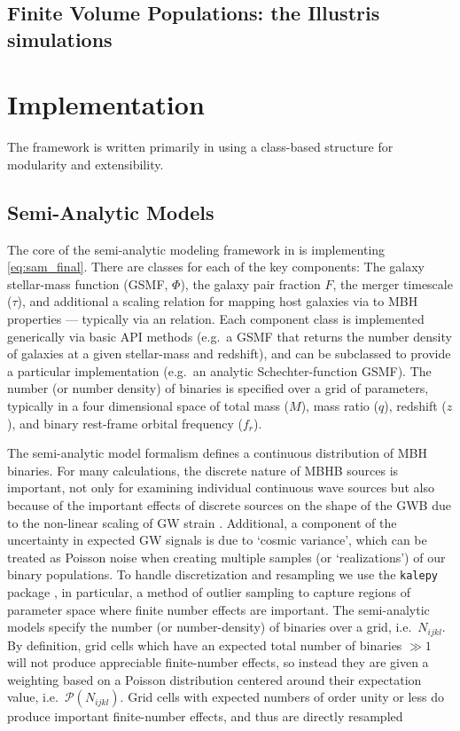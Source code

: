     \subsection{Finite Volume Populations: the Illustris simulations}




\section{Implementation}
    \label{sec:imp}

    The \holodeck{} framework is written primarily in \python{} using a class-based structure for modularity and extensibility.

    \subsection{Semi-Analytic Models}
        \label{sec:imp_sam}

        The core of the semi-analytic modeling framework in \holodeck{} is implementing \eqref{eq:sam_final}.  There are classes for each of the key components: The galaxy stellar-mass function (GSMF, $\Phi$), the galaxy pair fraction \(F\), the merger timescale ($\tau$), and additional a scaling relation for mapping host galaxies via to MBH properties --- typically via an \mmbulge{} relation.  Each component class is implemented generically via basic API methods (e.g.~a GSMF that returns the number density of galaxies at a given stellar-mass and redshift), and can be subclassed to provide a particular implementation (e.g.~an analytic Schechter-function GSMF).  The number (or number density) of binaries is specified over a grid of parameters, typically in a four dimensional space of total mass ($M$), mass ratio ($q$), redshift ($z$), and binary rest-frame orbital frequency ($f_r$).

        The semi-analytic model formalism defines a continuous distribution of MBH binaries.  For many calculations, the discrete nature of MBHB sources is important, not only for examining individual continuous wave sources but also because of the important effects of discrete sources on the shape of the GWB due to the non-linear scaling of GW strain \citep{Sesana+2008}.  Additional, a component of the uncertainty in expected GW signals is due to `cosmic variance', which can be treated as Poisson noise when creating multiple samples (or `realizations') of our binary populations.  To handle discretization and resampling we use the \texttt{kalepy} package \citep{kalepy2021}, in particular, a method of outlier sampling to capture regions of parameter space where finite number effects are important.  The \holodeck{} semi-analytic models specify the number (or number-density) of binaries over a grid, i.e.~$N_{ijkl}$.  By definition, grid cells which have an expected total number of binaries $\gg 1$ will not produce appreciable finite-number effects, so instead they are given a weighting based on a Poisson distribution centered around their expectation value, i.e.~$\mathcal{P}(N_{ijkl})$.  Grid cells with expected numbers of order unity or less do produce important finite-number effects, and thus are directly resampled

